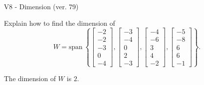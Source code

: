 \begin{exercise}
  \begin{exerciseTitle}V8 - Dimension (ver. 79)\end{exerciseTitle}
  \begin{exerciseStatement}
    Explain how to find the dimension of 
\[W=\mathrm{span}\ \left\{\left[\begin{array}{r}
-2 \\
-2 \\
-3 \\
0 \\
-4
\end{array}\right] , \left[\begin{array}{r}
-3 \\
-4 \\
0 \\
2 \\
-3
\end{array}\right] , \left[\begin{array}{r}
-4 \\
-6 \\
3 \\
4 \\
-2
\end{array}\right] , \left[\begin{array}{r}
-5 \\
-8 \\
6 \\
6 \\
-1
\end{array}\right]\right\}.\]



  \end{exerciseStatement}
  \begin{exerciseAnswer}
   The dimension of \(W\) is  \(2\).
  


  \end{exerciseAnswer}
\end{exercise}